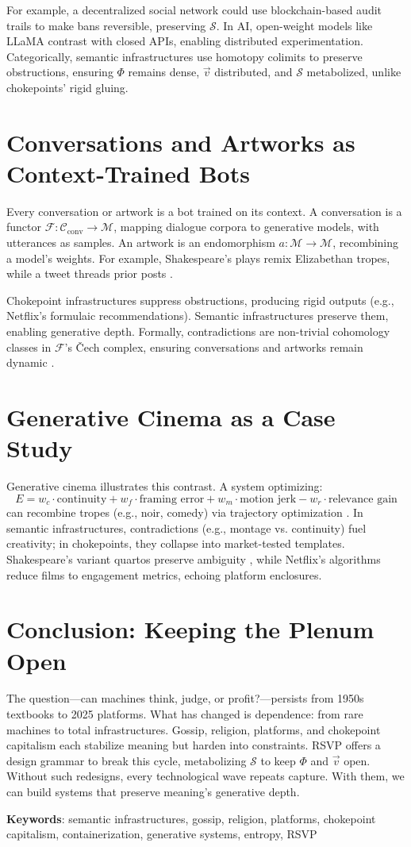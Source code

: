 \documentclass[a4paper,12pt]{article}
\newcommand{\C}{\mathcal{C}}
\newcommand{\M}{\mathcal{M}}
\newcommand{\F}{\mathcal{F}}
\newcommand{\Scal}{\mathcal{S}} %
\newcommand{\vvec}{\vec{v}} %
\begin{document}
For example, a decentralized social network could use blockchain-based audit trails to make bans reversible, preserving $\Scal$. In AI, open-weight models like LLaMA \citep{touvron2023llama} contrast with closed APIs, enabling distributed experimentation. Categorically, semantic infrastructures use homotopy colimits to preserve obstructions, ensuring $\Phi$ remains dense, $\vvec$ distributed, and $\Scal$ metabolized, unlike chokepoints’ rigid gluing.

\section{Conversations and Artworks as Context-Trained Bots}
Every conversation or artwork is a bot trained on its context. A conversation is a functor $\F: \C_{\text{conv}} \to \M$, mapping dialogue corpora to generative models, with utterances as samples. An artwork is an endomorphism $a: \M \to \M$, recombining a model’s weights. For example, Shakespeare’s plays remix Elizabethan tropes, while a tweet threads prior posts \citep{shakespeare1623folio}. 

Chokepoint infrastructures suppress obstructions, producing rigid outputs (e.g., Netflix’s formulaic recommendations). Semantic infrastructures preserve them, enabling generative depth. Formally, contradictions are non-trivial cohomology classes in $\F$’s Čech complex, ensuring conversations and artworks remain dynamic \citep{lurie2009higher}.

\section{Generative Cinema as a Case Study}
Generative cinema illustrates this contrast. A system optimizing:
\[
E = w_c \cdot \text{continuity} + w_f \cdot \text{framing error} + w_m \cdot \text{motion jerk} - w_r \cdot \text{relevance gain}
\]
can recombine tropes (e.g., noir, comedy) via trajectory optimization \citep{weller2025limit}. In semantic infrastructures, contradictions (e.g., montage vs. continuity) fuel creativity; in chokepoints, they collapse into market-tested templates. Shakespeare’s variant quartos preserve ambiguity \citep{shakespeare1623folio}, while Netflix’s algorithms reduce films to engagement metrics, echoing platform enclosures.

\section{Conclusion: Keeping the Plenum Open}
The question—can machines think, judge, or profit?—persists from 1950s textbooks to 2025 platforms. What has changed is dependence: from rare machines to total infrastructures. Gossip, religion, platforms, and chokepoint capitalism each stabilize meaning but harden into constraints. RSVP offers a design grammar to break this cycle, metabolizing $\Scal$ to keep $\Phi$ and $\vvec$ open. Without such redesigns, every technological wave repeats capture. With them, we can build systems that preserve meaning’s generative depth.

\textbf{Keywords}: semantic infrastructures, gossip, religion, platforms, chokepoint capitalism, containerization, generative systems, entropy, RSVP

\appendix




\end{document}
